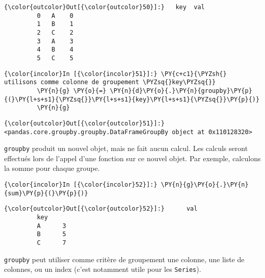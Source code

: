 \begin{Verbatim}[commandchars=\\\{\},frame=single,framerule=0.3mm,rulecolor=\color{cellframecolor}]
{\color{outcolor}Out[{\color{outcolor}50}]:}   key  val
         0   A    0
         1   B    1
         2   C    2
         3   A    3
         4   B    4
         5   C    5
\end{Verbatim}
            
    \begin{Verbatim}[commandchars=\\\{\},frame=single,framerule=0.3mm,rulecolor=\color{cellframecolor}]
{\color{incolor}In [{\color{incolor}51}]:} \PY{c+c1}{\PYZsh{} utilisons comme colonne de groupement \PYZsq{}key\PYZsq{}}
         \PY{n}{g} \PY{o}{=} \PY{n}{d}\PY{o}{.}\PY{n}{groupby}\PY{p}{(}\PY{l+s+s1}{\PYZsq{}}\PY{l+s+s1}{key}\PY{l+s+s1}{\PYZsq{}}\PY{p}{)}
         \PY{n}{g}
\end{Verbatim}


\begin{Verbatim}[commandchars=\\\{\},frame=single,framerule=0.3mm,rulecolor=\color{cellframecolor}]
{\color{outcolor}Out[{\color{outcolor}51}]:} <pandas.core.groupby.groupby.DataFrameGroupBy object at 0x110128320>
\end{Verbatim}
            
    \texttt{groupby} produit un nouvel objet, mais ne fait aucun calcul. Les
calculs seront effectués lors de l'appel d'une fonction sur ce nouvel
objet. Par exemple, calculons la somme pour chaque groupe.

    \begin{Verbatim}[commandchars=\\\{\},frame=single,framerule=0.3mm,rulecolor=\color{cellframecolor}]
{\color{incolor}In [{\color{incolor}52}]:} \PY{n}{g}\PY{o}{.}\PY{n}{sum}\PY{p}{(}\PY{p}{)}
\end{Verbatim}


\begin{Verbatim}[commandchars=\\\{\},frame=single,framerule=0.3mm,rulecolor=\color{cellframecolor}]
{\color{outcolor}Out[{\color{outcolor}52}]:}      val
         key     
         A      3
         B      5
         C      7
\end{Verbatim}
            
    \texttt{groupby} peut utiliser comme critère de groupement une colonne,
une liste de colonnes, ou un index (c'est notamment utile pour les
\texttt{Series}).

